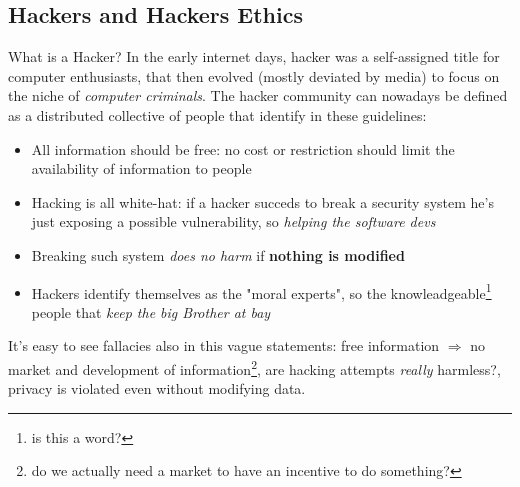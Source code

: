 \documentclass{article}
\begin{document}
		\subsection{Hackers and Hackers Ethics}
			What is a Hacker? In the early internet days, hacker was a self-assigned title for computer enthusiasts, that then evolved (mostly deviated by media) to focus on the niche of \textit{computer criminals}. The hacker community can nowadays be defined as a distributed collective of people that identify in these guidelines:
			\begin{itemize}
				\item All information should be free: no cost or restriction should limit the availability of information to people
				\item Hacking is all white-hat: if a hacker succeds to break a security system he's just exposing a possible vulnerability, so \textit{helping the software devs}
				\item Breaking such system \textit{does no harm} if \textbf{nothing is modified}
				\item Hackers identify themselves as the "moral experts", so the knowleadgeable\footnote{is this a word?} people that \textit{keep the big Brother at bay}
			\end{itemize}
			It's easy to see fallacies also in this vague statements: free information $\Rightarrow$ no market and development of information\footnote{do we actually need a market to have an incentive to do something?}, are hacking attempts \textit{really} harmless?, privacy is violated even without modifying data.
\end{document}
